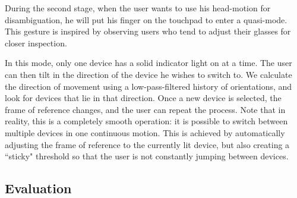 During the second stage, when the user wants to use his head-motion for disambiguation, he will put his finger on the touchpad to enter a quasi-mode.  This gesture is inspired by observing users who tend to adjust their glasses for closer inspection.

In this mode, only one device has a solid indicator light on at a time.  The user can then tilt in the direction of the device he wishes to switch to. We calculate the direction of movement using a low-pass-filtered history of orientations, and look for devices that lie in that direction. Once a new device is selected, the frame of reference changes, and the user can repeat the process. Note that in reality, this is a completely smooth operation: it is possible to switch between multiple devices in one continuous motion. This is achieved by automatically adjusting the frame of reference to the currently lit device, but also creating a ``sticky" threshold so that the user is not constantly jumping between devices. 




\subsection{Evaluation}




